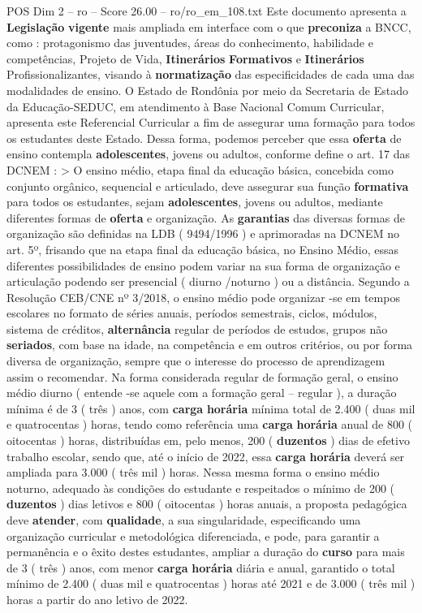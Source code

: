 \begin{textsample}{POS Dim 2 – ro – Score 26.00 – ro/ro\_em\_108.txt}
Este documento apresenta a \textbf{Legislação} \textbf{vigente} mais ampliada em interface com o que \textbf{preconiza} a BNCC, como : protagonismo das juventudes, áreas do conhecimento, habilidade e competências, Projeto de Vida, \textbf{Itinerários} \textbf{Formativos} e \textbf{Itinerários} Profissionalizantes, visando à \textbf{normatização} das especificidades de cada uma das modalidades de ensino.
O Estado de Rondônia por meio da Secretaria de Estado da Educação-SEDUC, em atendimento à Base Nacional Comum Curricular, apresenta este Referencial Curricular a fim de assegurar uma formação para todos os estudantes deste Estado.
Dessa forma, podemos perceber que essa \textbf{oferta} de ensino contempla \textbf{adolescentes}, jovens ou adultos, conforme define o art. 17 das DCNEM : > O ensino médio, etapa final da educação básica, concebida como conjunto orgânico, sequencial e articulado, deve assegurar sua função \textbf{formativa} para todos os estudantes, sejam \textbf{adolescentes}, jovens ou adultos, mediante diferentes formas de \textbf{oferta} e organização.
As \textbf{garantias} das diversas formas de organização são definidas na LDB ( 9494/1996 ) e aprimoradas na DCNEM no art. 5º, frisando que na etapa final da educação básica, no Ensino Médio, essas diferentes possibilidades de ensino podem variar na sua forma de organização e articulação podendo ser presencial ( diurno /noturno ) ou a distância.
Segundo a Resolução CEB/CNE nº 3/2018, o ensino médio pode organizar -se em tempos escolares no formato de séries anuais, períodos semestrais, ciclos, módulos, sistema de créditos, \textbf{alternância} regular de períodos de estudos, grupos não \textbf{seriados}, com base na idade, na competência e em outros critérios, ou por forma diversa de organização, sempre que o interesse do processo de aprendizagem assim o recomendar.
Na forma considerada regular de formação geral, o ensino médio diurno ( entende -se aquele com a formação geral – regular ), a duração mínima é de 3 ( três ) anos, com \textbf{carga} \textbf{horária} mínima total de 2.400 ( duas mil e quatrocentas ) horas, tendo como referência uma \textbf{carga} \textbf{horária} anual de 800 ( oitocentas ) horas, distribuídas em, pelo menos, 200 ( \textbf{duzentos} ) dias de efetivo trabalho escolar, sendo que, até o início de 2022, essa \textbf{carga} \textbf{horária} deverá ser ampliada para 3.000 ( três mil ) horas.
Nessa mesma forma o ensino médio noturno, adequado às condições do estudante e respeitados o mínimo de 200 ( \textbf{duzentos} ) dias letivos e 800 ( oitocentas ) horas anuais, a proposta pedagógica deve \textbf{atender}, com \textbf{qualidade}, a sua singularidade, especificando uma organização curricular e metodológica diferenciada, e pode, para garantir a permanência e o êxito destes estudantes, ampliar a duração do \textbf{curso} para mais de 3 ( três ) anos, com menor \textbf{carga} \textbf{horária} diária e anual, garantido o total mínimo de 2.400 ( duas mil e quatrocentas ) horas até 2021 e de 3.000 ( três mil ) horas a partir do ano letivo de 2022.

\end{textsample}
